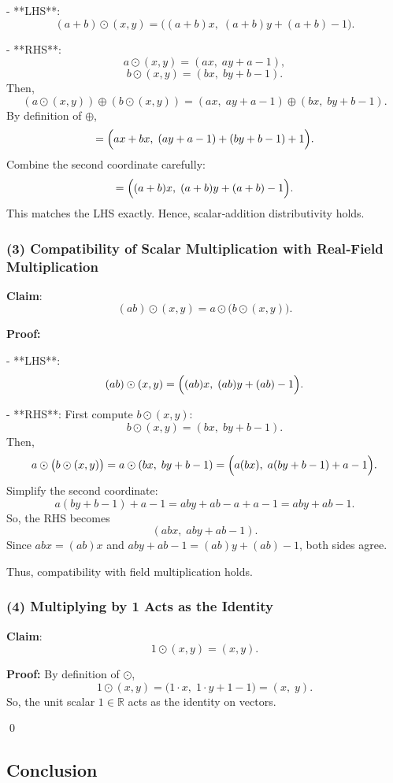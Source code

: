 \documentclass[12pt]{article}
\begin{document}
- **LHS**:
\[
(a + b) \odot (x,y) = \bigl((a + b)x,\; (a + b)y + (a + b) - 1\bigr).
\]

- **RHS**:
\[
a \odot (x,y) = (a x,\; a y + a - 1),
\]
\[
b \odot (x,y) = (b x,\; b y + b - 1).
\]
Then,
\[
(a \odot (x,y)) \oplus (b \odot (x,y)) = (a x,\; a y + a - 1) \oplus (b x,\; b y + b - 1).
\]
By definition of \(\oplus\),
\[
= \Bigl(a x + b x,\; (a y + a - 1) + (b y + b - 1) + 1\Bigr).
\]
Combine the second coordinate carefully:
\[
= \Bigl((a + b)x,\; (a + b)y + (a + b) - 1\Bigr).
\]
This matches the LHS exactly. Hence, scalar‐addition distributivity holds.

\subsubsection*{(3) Compatibility of Scalar Multiplication with Real‐Field Multiplication}

\textbf{Claim}:
\[
(a b) \odot (x,y) = a \odot \bigl(b \odot (x,y)\bigr).
\]

\textbf{Proof:}

- **LHS**:
\[
(a b) \odot (x,y) = \Bigl((a b)x,\; (a b)y + (a b) - 1\Bigr).
\]

- **RHS**:
First compute \(b \odot (x,y)\):
\[
b \odot (x,y) = (b x,\; b y + b - 1).
\]
Then,
\[
a \odot \bigl(b \odot (x,y)\bigr) = a \odot (b x,\; b y + b - 1) = \Bigl(a(b x),\; a(b y + b - 1) + a - 1\Bigr).
\]
Simplify the second coordinate:
\[
a(b y + b - 1) + a - 1 = a b y + a b - a + a - 1 = a b y + a b - 1.
\]
So, the RHS becomes
\[
(a b x,\; a b y + a b - 1).
\]
Since \(a b x = (a b)x\) and \(a b y + a b - 1 = (a b)y + (a b) - 1\), both sides agree.

Thus, compatibility with field multiplication holds.

\subsubsection*{(4) Multiplying by 1 Acts as the Identity}

\textbf{Claim}:
\[
1 \odot (x,y) = (x,y).
\]

\textbf{Proof:}
By definition of \(\odot\),
\[
1 \odot (x,y) = \bigl(1 \cdot x,\; 1 \cdot y + 1 - 1\bigr) = (x,\; y).
\]
So, the unit scalar \(1 \in \mathbb{R}\) acts as the identity on vectors.

\qed
\subsection*{Conclusion}
\end{document}
